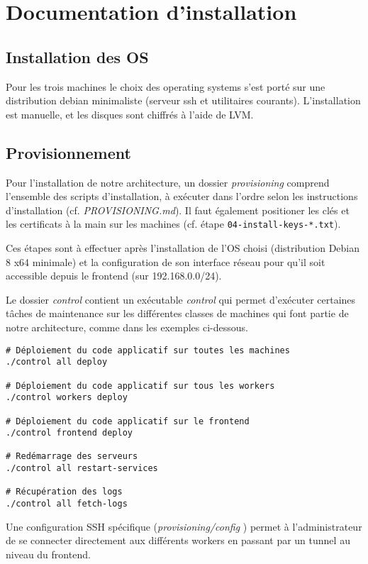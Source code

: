 \newpage

\chapter{Documentation d'installation}

\section{Installation des OS}

Pour les trois machines le choix des operating systems s'est porté sur une distribution debian minimaliste (serveur ssh et utilitaires courants). L'installation est manuelle, et les disques sont chiffrés à l'aide de LVM.

\section{Provisionnement}

Pour l'installation de notre architecture, un dossier {\it provisioning} comprend l'ensemble des scripts d'installation,
à exécuter dans l'ordre selon les instructions d'installation (cf. {\it PROVISIONING.md}). Il faut également positioner
les clés et les certificats à la main sur les machines (cf. étape {\tt 04-install-keys-*.txt}).

Ces étapes sont à effectuer après l'installation de l'OS choisi (distribution Debian 8 x64 minimale) et la
configuration de son interface réseau pour qu'il soit accessible depuis le frontend (sur 192.168.0.0/24).

Le dossier {\it control} contient un exécutable {\it control} qui permet d'exécuter certaines tâches de maintenance sur
les différentes classes de machines qui font partie de notre architecture, comme dans les exemples ci-dessous. 

\begin{verbatim}
# Déploiement du code applicatif sur toutes les machines
./control all deploy

# Déploiement du code applicatif sur tous les workers
./control workers deploy

# Déploiement du code applicatif sur le frontend
./control frontend deploy

# Redémarrage des serveurs
./control all restart-services

# Récupération des logs
./control all fetch-logs
\end{verbatim}

Une configuration SSH spécifique ({\it provisioning/config }) permet à l'administrateur de se connecter directement aux
différents workers en passant par un tunnel au niveau du frontend.
